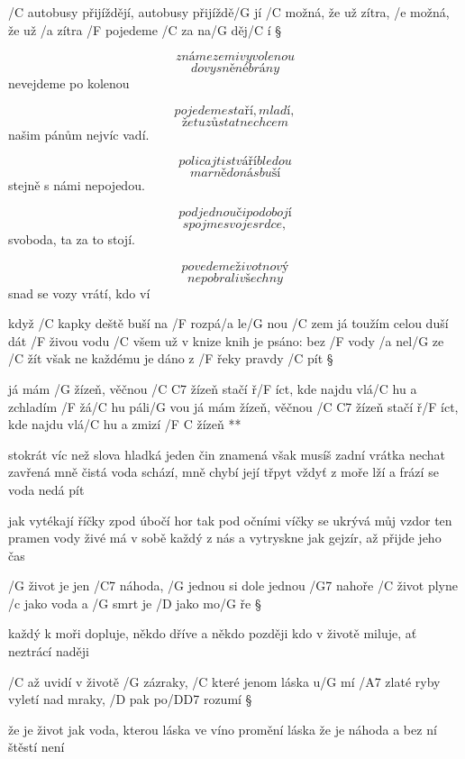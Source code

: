 
/C autobusy přijíždějí, autobusy přijíždě/G jí
/C možná, že už zítra, /e možná, že už /a zítra
/F pojedeme /C za na/G děj/C í \S

\[ známe zemi vyvolenou \]
\[ do vysněné brány \]
nevejdeme po kolenou \s

\[ pojedeme staří, mladí, \]
\[ že tu zůstat nechcem \]
našim pánům nejvíc vadí. \s

\[ policajti s tváří bledou \]
\[ marně do nás buší \]
stejně s námi nepojedou. \s

\[ pod jednou či podobojí \]
\[ spojme svoje srdce, \]
svoboda, ta za to stojí. \s

\[ povedeme život nový \]
\[ nepobrali všechny \]
snad se vozy vrátí, kdo ví \s




když /C kapky deště buší na /F rozpá/a le/G nou /C zem
já toužím celou duší dát /F živou vodu /C všem
už v knize knih je psáno: bez /F vody /a nel/G ze /C žít
však ne každému je dáno z /F řeky pravdy /C pít \S

\R já mám /G žízeň, věčnou /{C C7} žízeň
   stačí ř/F íct, kde najdu vlá/C hu a zchladím /F žá/C hu páli/G vou
   já mám žízeň, věčnou /{C C7} žízeň
   stačí ř/F íct, kde najdu vlá/C hu a zmizí /{F C} žízeň **

stokrát víc než slova hladká jeden čin znamená
však musíš zadní vrátka nechat zavřená
mně čistá voda schází, mně chybí její třpyt
vždyť z moře lží a frází se voda nedá pít \s

jak vytékají říčky zpod úbočí hor
tak pod očními víčky se ukrývá můj vzdor
ten pramen vody živé má v sobě každý z nás
a vytryskne jak gejzír, až přijde jeho čas




/G život je jen /C7 náhoda, /G jednou si dole jednou /G7 nahoře
/C život plyne /c jako voda a /G smrt je /D jako mo/G ře \S

každý k moři dopluje, někdo dříve a někdo později
kdo v životě miluje, ať neztrácí naději \s

/C až uvidí v životě /G zázraky, /C které jenom láska u/G mí
/A7 zlaté ryby vyletí nad mraky, /D pak po/{D\dim D7} rozumí \S

že je život jak voda, kterou láska ve víno promění
láska že je náhoda a bez ní štěstí není



